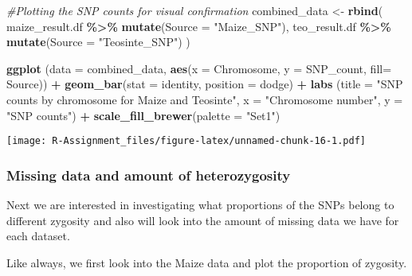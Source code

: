 \documentclass[
]{article}
\newenvironment{Shaded}{\begin{snugshade}}{\end{snugshade}}
\newcommand{\AttributeTok}[1]{\textcolor[rgb]{0.13,0.29,0.53}{#1}}
\newcommand{\CommentTok}[1]{\textcolor[rgb]{0.56,0.35,0.01}{\textit{#1}}}
\newcommand{\FunctionTok}[1]{\textcolor[rgb]{0.13,0.29,0.53}{\textbf{#1}}}
\newcommand{\NormalTok}[1]{#1}
\newcommand{\OtherTok}[1]{\textcolor[rgb]{0.56,0.35,0.01}{#1}}
\newcommand{\SpecialCharTok}[1]{\textcolor[rgb]{0.81,0.36,0.00}{\textbf{#1}}}
\newcommand{\StringTok}[1]{\textcolor[rgb]{0.31,0.60,0.02}{#1}}
\begin{document}
\begin{Shaded}
\begin{Highlighting}[]
\CommentTok{\#Plotting the SNP counts for visual confirmation}
\NormalTok{combined\_data }\OtherTok{\textless{}{-}} \FunctionTok{rbind}\NormalTok{(}
\NormalTok{  maize\_result.df }\SpecialCharTok{\%\textgreater{}\%} \FunctionTok{mutate}\NormalTok{(}\AttributeTok{Source =} \StringTok{"Maize\_SNP"}\NormalTok{),}
\NormalTok{  teo\_result.df }\SpecialCharTok{\%\textgreater{}\%} \FunctionTok{mutate}\NormalTok{(}\AttributeTok{Source =} \StringTok{"Teosinte\_SNP"}\NormalTok{)}
\NormalTok{)}

\FunctionTok{ggplot}\NormalTok{ (}\AttributeTok{data =}\NormalTok{ combined\_data,}
        \FunctionTok{aes}\NormalTok{(}\AttributeTok{x =}\NormalTok{ Chromosome, }\AttributeTok{y =}\NormalTok{ SNP\_count, }\AttributeTok{fill=}\NormalTok{ Source)) }\SpecialCharTok{+}
  \FunctionTok{geom\_bar}\NormalTok{(}\AttributeTok{stat =} \StringTok{\textquotesingle{}identity\textquotesingle{}}\NormalTok{, }\AttributeTok{position =} \StringTok{\textquotesingle{}dodge\textquotesingle{}}\NormalTok{) }\SpecialCharTok{+}
  \FunctionTok{labs}\NormalTok{ (}\AttributeTok{title =} \StringTok{"SNP counts by chromosome for Maize and Teosinte"}\NormalTok{,}
        \AttributeTok{x =} \StringTok{"Chromosome number"}\NormalTok{,}
        \AttributeTok{y =} \StringTok{"SNP counts"}\NormalTok{) }\SpecialCharTok{+}
  \FunctionTok{scale\_fill\_brewer}\NormalTok{(}\AttributeTok{palette =} \StringTok{"Set1"}\NormalTok{)}
\end{Highlighting}
\end{Shaded}

\texttt{[image: R-Assignment\_files/figure-latex/unnamed-chunk-16-1.pdf]}

\subsubsection{Missing data and amount of
heterozygosity}\label{missing-data-and-amount-of-heterozygosity}

Next we are interested in investigating what proportions of the SNPs
belong to different zygosity and also will look into the amount of
missing data we have for each dataset.

Like always, we first look into the Maize data and plot the proportion
of zygosity.
\end{document}
